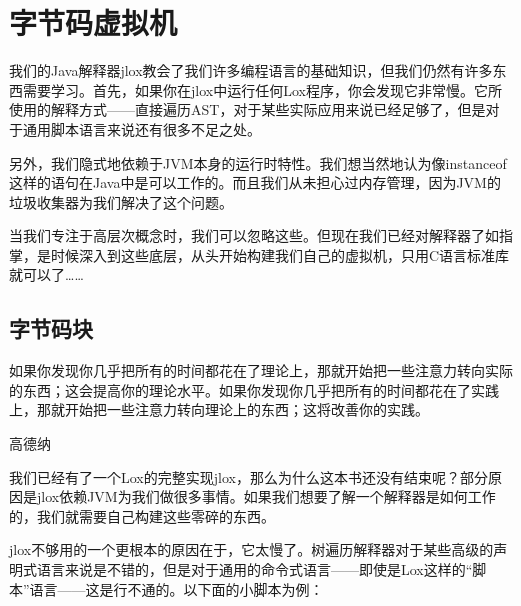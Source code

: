 \documentclass[cn,11pt,chinese]{elegantbook}
\newenvironment{code}[4][]
{\VerbatimEnvironment
  \begin{center}
  \begin{tcolorbox}[space to upper,
    skin=bicolor,
    colbacklower=black!75,
    collower=white,
    title={#4},
    halign=center,
    valign=center,
    nobeforeafter,
    halign lower=flush right,
    ]
    \begin{verbatim}}
    {\end{verbatim}\end{tcolorbox}\end{center}}
\begin{document}

\part{字节码虚拟机}

我们的Java解释器jlox教会了我们许多编程语言的基础知识，但我们仍然有许多东西需要学习。首先，如果你在jlox中运行任何Lox程序，你会发现它非常慢。它所使用的解释方式——直接遍历AST，对于某些实际应用来说已经足够了，但是对于通用脚本语言来说还有很多不足之处。

另外，我们隐式地依赖于JVM本身的运行时特性。我们想当然地认为像instanceof这样的语句在Java中是可以工作的。而且我们从未担心过内存管理，因为JVM的垃圾收集器为我们解决了这个问题。

当我们专注于高层次概念时，我们可以忽略这些。但现在我们已经对解释器了如指掌，是时候深入到这些底层，从头开始构建我们自己的虚拟机，只用C语言标准库就可以了……

\chapter{字节码块}

\epigraph{如果你发现你几乎把所有的时间都花在了理论上，那就开始把一些注意力转向实际的东西；这会提高你的理论水平。如果你发现你几乎把所有的时间都花在了实践上，那就开始把一些注意力转向理论上的东西；这将改善你的实践。}{高德纳}

我们已经有了一个Lox的完整实现jlox，那么为什么这本书还没有结束呢？部分原因是jlox依赖JVM为我们做很多事情。如果我们想要了解一个解释器是如何工作的，我们就需要自己构建这些零碎的东西。

jlox不够用的一个更根本的原因在于，它太慢了。树遍历解释器对于某些高级的声明式语言来说是不错的，但是对于通用的命令式语言——即使是Lox这样的“脚本”语言——这是行不通的。以下面的小脚本为例：
\end{document}
